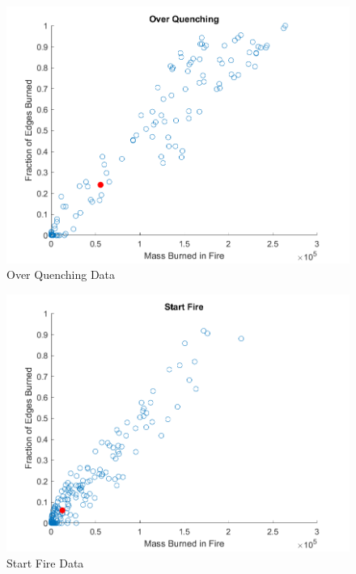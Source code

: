\documentclass[ aps, pra, reprint, notitlepage ]{revtex4-1}
\begin{document}
\begin{figure}[ht]
	\includegraphics[scale=0.6]{Data/OverQuenching}
	\caption{\label{OverQuenching} Over Quenching Data}
\end{figure}
\begin{figure}[ht]
	\includegraphics[scale=0.6]{Data/StartFire}
	\caption{\label{StartFire} Start Fire Data}
\end{figure}

\end{document}
